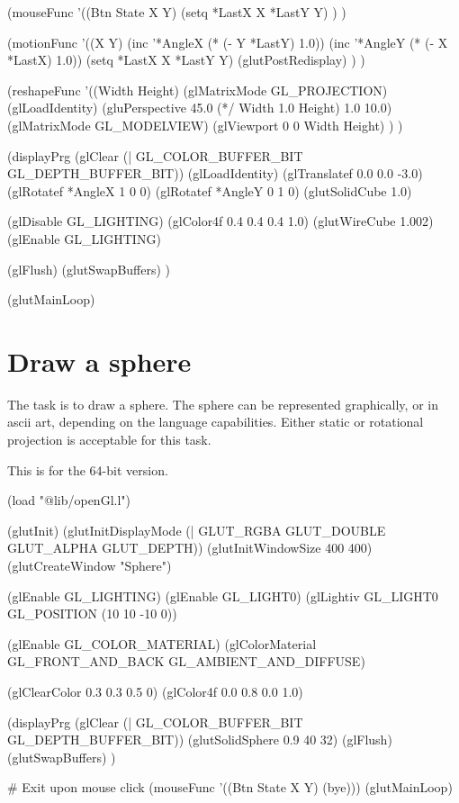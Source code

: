 \begin{wideverbatim}

(mouseFunc
   '((Btn State X Y)
      (setq *LastX X  *LastY Y) ) )

(motionFunc
   '((X Y)
      (inc '*AngleX (* (- Y *LastY) 1.0))
      (inc '*AngleY (* (- X *LastX) 1.0))
      (setq *LastX X  *LastY Y)
      (glutPostRedisplay) ) )

(reshapeFunc
   '((Width Height)
      (glMatrixMode GL_PROJECTION)
      (glLoadIdentity)
      (gluPerspective 45.0 (*/ Width 1.0 Height) 1.0 10.0)
      (glMatrixMode GL_MODELVIEW)
      (glViewport 0 0 Width Height) ) )

(displayPrg
	(glClear (| GL_COLOR_BUFFER_BIT GL_DEPTH_BUFFER_BIT))
	(glLoadIdentity)
	(glTranslatef 0.0 0.0 -3.0)
	(glRotatef *AngleX 1 0 0)
	(glRotatef *AngleY 0 1 0)
	(glutSolidCube 1.0)
	
	(glDisable GL_LIGHTING)
	(glColor4f 0.4 0.4 0.4 1.0)
	(glutWireCube 1.002)
	(glEnable GL_LIGHTING)
	
	(glFlush)
	(glutSwapBuffers) )

(glutMainLoop)

\end{wideverbatim}

\pagebreak{}
\section*{Draw a sphere}

The task is to draw a sphere. The sphere can be represented graphically,
or in ascii art, depending on the language capabilities. Either static
or rotational projection is acceptable for this task.

\begin{wideverbatim}

This is for the 64-bit version.

(load "@lib/openGl.l")

(glutInit)
(glutInitDisplayMode (| GLUT_RGBA GLUT_DOUBLE GLUT_ALPHA GLUT_DEPTH))
(glutInitWindowSize 400 400)
(glutCreateWindow "Sphere")

(glEnable GL_LIGHTING)
(glEnable GL_LIGHT0)
(glLightiv GL_LIGHT0 GL_POSITION (10 10 -10 0))

(glEnable GL_COLOR_MATERIAL)
(glColorMaterial GL_FRONT_AND_BACK GL_AMBIENT_AND_DIFFUSE)

(glClearColor 0.3 0.3 0.5 0)
(glColor4f 0.0 0.8 0.0 1.0)

(displayPrg
   (glClear (| GL_COLOR_BUFFER_BIT GL_DEPTH_BUFFER_BIT))
   (glutSolidSphere 0.9 40 32)
   (glFlush)
   (glutSwapBuffers) )

# Exit upon mouse click
(mouseFunc '((Btn State X Y) (bye)))
(glutMainLoop)

\end{wideverbatim}


